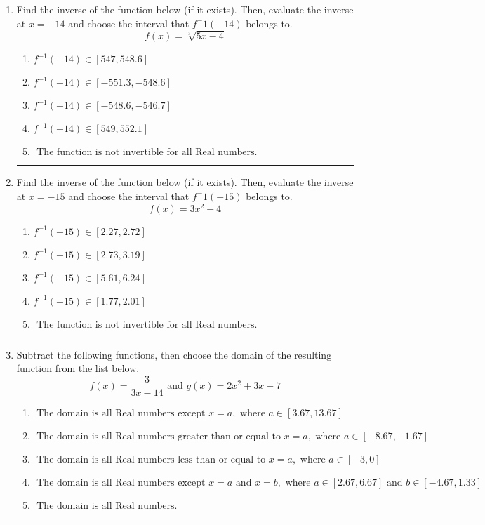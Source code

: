 \documentclass[14pt]{extbook}
\newcommand{\litem}[1]{\item#1\hspace*{-1cm}\rule{\textwidth}{0.4pt}}
\begin{document}
\begin{enumerate}
{\begin{enumerate}[label=\Alph*.]
\end{enumerate} }
\litem{
Find the inverse of the function below (if it exists). Then, evaluate the inverse at $x = -14$ and choose the interval that $f^-1(-14)$ belongs to.\[ f(x) = \sqrt[3]{5 x - 4} \]\begin{enumerate}[label=\Alph*.]
\item \( f^{-1}(-14) \in [547, 548.6] \)
\item \( f^{-1}(-14) \in [-551.3, -548.6] \)
\item \( f^{-1}(-14) \in [-548.6, -546.7] \)
\item \( f^{-1}(-14) \in [549, 552.1] \)
\item \( \text{ The function is not invertible for all Real numbers. } \)

\end{enumerate} }
\litem{
Find the inverse of the function below (if it exists). Then, evaluate the inverse at $x = -15$ and choose the interval that $f^-1(-15)$ belongs to.\[ f(x) = 3 x^2 - 4 \]\begin{enumerate}[label=\Alph*.]
\item \( f^{-1}(-15) \in [2.27, 2.72] \)
\item \( f^{-1}(-15) \in [2.73, 3.19] \)
\item \( f^{-1}(-15) \in [5.61, 6.24] \)
\item \( f^{-1}(-15) \in [1.77, 2.01] \)
\item \( \text{ The function is not invertible for all Real numbers. } \)

\end{enumerate} }
\litem{
Subtract the following functions, then choose the domain of the resulting function from the list below.\[ f(x) = \frac{3}{3x-14} \text{ and } g(x) = 2x^{2} +3 x + 7 \]\begin{enumerate}[label=\Alph*.]
\item \( \text{ The domain is all Real numbers except } x = a, \text{ where } a \in [3.67, 13.67] \)
\item \( \text{ The domain is all Real numbers greater than or equal to } x = a, \text{ where } a \in [-8.67, -1.67] \)
\item \( \text{ The domain is all Real numbers less than or equal to } x = a, \text{ where } a \in [-3, 0] \)
\item \( \text{ The domain is all Real numbers except } x = a \text{ and } x = b, \text{ where } a \in [2.67, 6.67] \text{ and } b \in [-4.67, 1.33] \)
\item \( \text{ The domain is all Real numbers. } \)


\end{enumerate}}
\end{enumerate}
\end{document}
